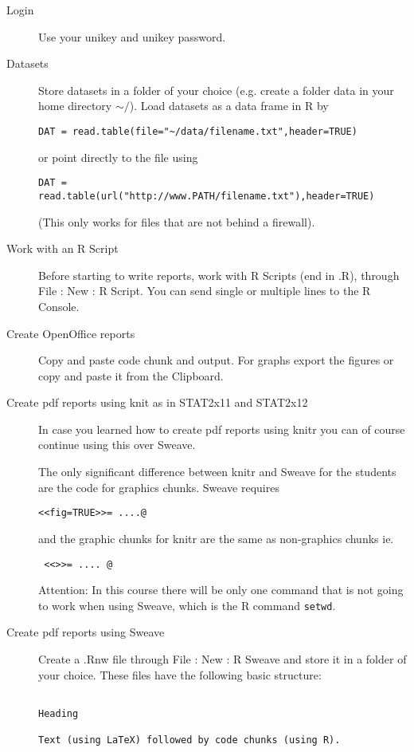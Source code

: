 \documentclass[11pt,a4paper]{article}
\begin{document}
\vspace{-2mm}\begin{description}
\item[Login] Use your unikey and unikey password.
\item[Datasets] Store datasets in a folder of your choice (e.g. create a folder {data} in your home directory $\sim/$). Load datasets as a data frame in R by
\begin{verbatim}
DAT = read.table(file="~/data/filename.txt",header=TRUE)
\end{verbatim}
or point directly to the file using 
\begin{verbatim}
DAT = read.table(url("http://www.PATH/filename.txt"),header=TRUE)
\end{verbatim}
(This only works for files that are not behind a firewall).
\item[Work with an R Script] Before starting to write reports, work with R Scripts (end in {.R}), through {File : New : R Script}. You can send single or multiple lines to the R Console.
\item[Create OpenOffice reports] Copy and paste code chunk and output. For graphs export the figures or copy and paste it from the Clipboard.
\item[Create pdf reports using knit as in STAT2x11 and STAT2x12] In case you learned how to create pdf reports using knitr you can of course continue using this over Sweave.

The only significant difference between knitr and Sweave for the students are the code for graphics chunks. Sweave requires 
\begin{verbatim}
<<fig=TRUE>>= ....@
\end{verbatim}
and the graphic chunks for knitr are the same as non-graphics chunks  ie. 
\begin{verbatim}
 <<>>= .... @
\end{verbatim}

Attention: In this course there will be only one command that is not going
to work when using Sweave, which is the R command \texttt{setwd}.

\item[Create pdf reports using Sweave] Create a {.Rnw} file through {File : New : R Sweave} and store it in a folder of your choice. These files have the following basic structure:

\begin{verbatim}

Heading

Text (using LaTeX) followed by code chunks (using R). 


\end{verbatim}
\end{description}
\end{document}
